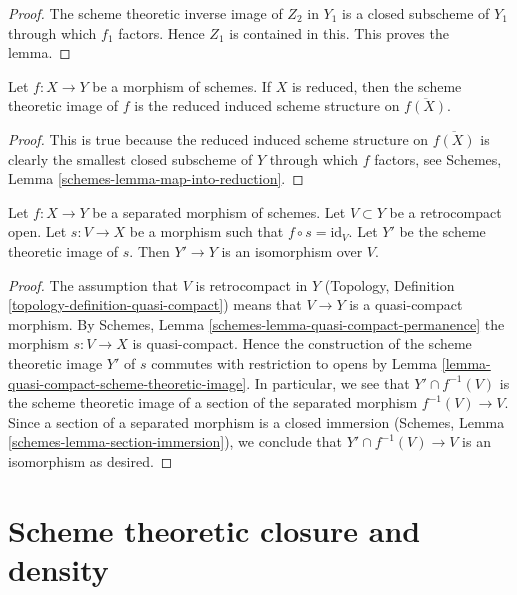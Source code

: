 \begin{proof}
The scheme theoretic inverse image of $Z_2$ in $Y_1$
is a closed subscheme of $Y_1$ through
which $f_1$ factors. Hence $Z_1$ is contained in this.
This proves the lemma.
\end{proof}

\begin{lemma}
\label{lemma-scheme-theoretic-image-reduced}
Let $f : X \to Y$ be a morphism of schemes.
If $X$ is reduced, then the scheme theoretic image of $f$ is
the reduced induced scheme structure on $\overline{f(X)}$.
\end{lemma}

\begin{proof}
This is true because the reduced induced scheme structure on $\overline{f(X)}$
is clearly the smallest closed subscheme of $Y$ through which $f$ factors,
see
Schemes, Lemma \ref{schemes-lemma-map-into-reduction}.
\end{proof}

\begin{lemma}
\label{lemma-scheme-theoretic-image-of-partial-section}
Let $f : X \to Y$ be a separated morphism of schemes.
Let $V \subset Y$ be a retrocompact open. Let $s : V \to X$
be a morphism such that $f \circ s = \text{id}_V$.
Let $Y'$ be the scheme theoretic image of $s$.
Then $Y' \to Y$ is an isomorphism over $V$.
\end{lemma}

\begin{proof}
The assumption that $V$ is retrocompact in $Y$
(Topology, Definition \ref{topology-definition-quasi-compact})
means that $V \to Y$ is a quasi-compact morphism.
By Schemes, Lemma \ref{schemes-lemma-quasi-compact-permanence}
the morphism $s : V \to X$ is quasi-compact.
Hence the construction of the scheme theoretic image $Y'$
of $s$ commutes with restriction to opens by
Lemma \ref{lemma-quasi-compact-scheme-theoretic-image}.
In particular, we see that $Y' \cap f^{-1}(V)$ is the
scheme theoretic image of a section of the separated
morphism $f^{-1}(V) \to V$. Since a section of a separated
morphism is a closed immersion
(Schemes, Lemma \ref{schemes-lemma-section-immersion}),
we conclude that
$Y' \cap f^{-1}(V) \to V$ is an isomorphism as desired.
\end{proof}







\section{Scheme theoretic closure and density}
\label{section-scheme-theoretic-closure}

